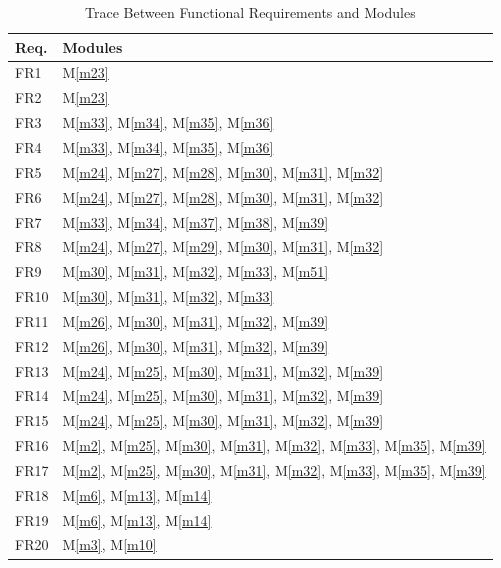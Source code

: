 \documentclass[12pt, titlepage]{article}
\newcommand{\mref}[1]{M\ref{#1}}
\begin{document}
		\begin{longtable}{p{} p{}}
			\caption{Trace Between Functional Requirements and Modules}
			\label{TblRT} \\
			\toprule
			\textbf{Req.} & \textbf{Modules}\\
			\midrule
			FR1 & \mref{m23} \\
			FR2 & \mref{m23} \\
			FR3 & \mref{m33}, \mref{m34}, \mref{m35}, \mref{m36} \\
			FR4 & \mref{m33}, \mref{m34}, \mref{m35}, \mref{m36} \\
			FR5 & \mref{m24}, \mref{m27}, \mref{m28}, \mref{m30}, \mref{m31}, \mref{m32} \\
			FR6 & \mref{m24}, \mref{m27}, \mref{m28}, \mref{m30}, \mref{m31}, \mref{m32} \\
			FR7 & \mref{m33}, \mref{m34}, \mref{m37}, \mref{m38}, \mref{m39}\\
			FR8 & \mref{m24}, \mref{m27}, \mref{m29}, \mref{m30}, \mref{m31}, \mref{m32} \\
			FR9 & \mref{m30}, \mref{m31}, \mref{m32}, \mref{m33}, \mref{m51} \\
			FR10 & \mref{m30}, \mref{m31}, \mref{m32}, \mref{m33} \\
			FR11 & \mref{m26}, \mref{m30}, \mref{m31}, \mref{m32}, \mref{m39} \\
			FR12 & \mref{m26}, \mref{m30}, \mref{m31}, \mref{m32}, \mref{m39} \\
			FR13 & \mref{m24}, \mref{m25}, \mref{m30}, \mref{m31}, \mref{m32}, \mref{m39} \\
			FR14 & \mref{m24}, \mref{m25}, \mref{m30}, \mref{m31}, \mref{m32}, \mref{m39} \\
			FR15 & \mref{m24}, \mref{m25}, \mref{m30}, \mref{m31}, \mref{m32}, \mref{m39} \\
			FR16 & \mref{m2}, \mref{m25}, \mref{m30}, \mref{m31}, \mref{m32}, \mref{m33}, \mref{m35}, \mref{m39} \\
			FR17 & \mref{m2}, \mref{m25}, \mref{m30}, \mref{m31}, \mref{m32}, \mref{m33}, \mref{m35}, \mref{m39} \\
			FR18 & \mref{m6}, \mref{m13}, \mref{m14}\\
			FR19 & \mref{m6}, \mref{m13}, \mref{m14} \\
			FR20 & \mref{m3}, \mref{m10} \\

\end{longtable}
\end{document}
